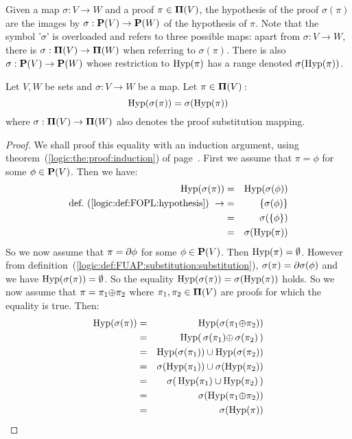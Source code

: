 Given a map $\sigma:V\to W$ and a proof $\pi\in\mbox{${\bf\Pi}(V)$}$, the hypothesis
of the proof $\sigma(\pi)$ are the images by $\sigma:\mbox{${\bf P}(V)$}\to{\bf
P}(W)$ of the hypothesis of $\pi$. Note that the symbol '$\sigma$'
is overloaded and refers to three possible maps: apart from
$\sigma:V\to W$, there is $\sigma:\mbox{${\bf\Pi}(V)$}\to{\bf\Pi}(W)$ when referring
to $\sigma(\pi)$. There is also $\sigma:\mbox{${\bf P}(V)$}\to{\bf P}(W)$ whose
restriction to $\mbox{\rm Hyp}(\pi)$ has a range denoted $\sigma(\mbox{\rm Hyp}(\pi))$.
\begin{prop}\label{logic:prop:FUAP:substitution:hypothesis}
Let $V, W$ be sets and $\sigma:V\to W$ be a map. Let $\pi\in\mbox{${\bf\Pi}(V)$}$\,:
    \[
    \mbox{\rm Hyp}(\sigma(\pi))=\sigma(\mbox{\rm Hyp}(\pi))
    \]
where $\sigma:\mbox{${\bf\Pi}(V)$}\to{\bf\Pi}(W)$ also denotes the proof
substitution mapping.
\end{prop}
\begin{proof}
We shall proof this equality with an induction argument, using
theorem~(\ref{logic:the:proof:induction}) of
page~\pageref{logic:the:proof:induction}. First we assume that
$\pi=\phi$ for some $\phi\in\mbox{${\bf P}(V)$}$. Then we have:
    \begin{eqnarray*}
    \mbox{\rm Hyp}(\sigma(\pi))&=&\mbox{\rm Hyp}(\sigma(\phi))\\
    \mbox{def.~(\ref{logic:def:FOPL:hypothesis})}\ \rightarrow
    &=&\{\sigma(\phi)\}\\
    &=&\sigma(\{\phi\})\\
    &=&\sigma(\mbox{\rm Hyp}(\pi))
    \end{eqnarray*}
So we now assume that $\pi=\mbox{$\partial$}\phi$ for some $\phi\in\mbox{${\bf P}(V)$}$. Then
$\mbox{\rm Hyp}(\pi)=\emptyset$. However from
definition~(\ref{logic:def:FUAP:substitution:substitution}),
$\sigma(\pi)=\mbox{$\partial$}\sigma(\phi)$ and  we have
$\mbox{\rm Hyp}(\sigma(\pi))=\emptyset$. So the equality
$\mbox{\rm Hyp}(\sigma(\pi))=\sigma(\mbox{\rm Hyp}(\pi))$ holds. So we now assume that
$\pi=\pi_{1}\mbox{$\oplus$}\pi_{2}$ where $\pi_{1},\pi_{2}\in\mbox{${\bf\Pi}(V)$}$ are proofs
for which the equality is true. Then:
    \begin{eqnarray*}
    \hyp(\sigma(\pi))&=&\hyp(\sigma(\pi_{1}\pon\pi_{2}))\\
    &=&\hyp(\,\sigma(\pi_{1})\pon\,\sigma(\pi_{2})\,)\\
    &=&\hyp(\sigma(\pi_{1}))\cup\hyp(\sigma(\pi_{2}))\\
    &=&\sigma(\hyp(\pi_{1}))\cup\sigma(\hyp(\pi_{2}))\\
    &=&\sigma(\,\hyp(\pi_{1})\cup\hyp(\pi_{2})\,)\\
    &=&\sigma(\hyp(\pi_{1}\pon\pi_{2}))\\
    &=&\sigma(\hyp(\pi))\\

\end{eqnarray*}
\end{proof}
